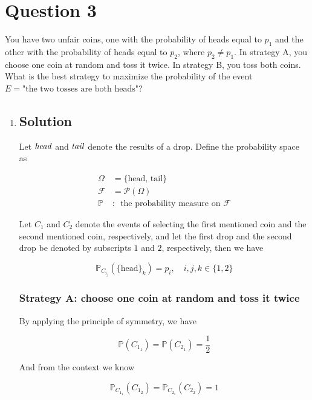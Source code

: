 \documentclass[12pt]{article}
\newcommand{\bP}{\mathbb{P}}
\begin{document}
	
	\section*{Question 3}
	
	\noindent You have two unfair coins, one with the probability of heads equal to $p_1$ and the other with the probability of heads equal to $p_2$, where $p_2 \neq p_1$. In strategy A, you choose one coin at random and toss it twice. In strategy B, you toss both coins. What is the best strategy to maximize the probability of the event $E = \text{"the two tosses are both heads"}$?
	
	\begin{enumerate}[label={},leftmargin=0in]\item
		
		\subsection*{Solution}
			
			Let $\it{head}$ and $\it{tail}$ denote the results of a drop. Define the probability space as
		
			\[
			\begin{aligned}
				\Omega &= \{\mathrm{head},\,\mathrm{tail}\}\\
				\mathcal{F} &= \mathcal{P}(\Omega)\\
				\bP &:\enspace \text{the probability measure on $\mathcal{F}$}
			\end{aligned}
			\]
			
			Let $C_1$ and $C_2$ denote the events of selecting the first mentioned coin and the second mentioned coin, respectively, and let the first drop and the second drop be denoted by subscripts $1$ and $2$, respectively, then we have
			
			\[\bP_{C_{i_j}}(\{\mathrm{head}\}_k) = p_i,\quad i,j,k\in\{1,2\}\]
			
			\subsubsection*{Strategy A: choose one coin at random and toss it twice}
			
			By applying the principle of symmetry, we have
			
			\[\bP(C_{1_1}) = \bP(C_{2_1}) = \frac{1}{2}\]
			
			And from the context we know
			
			\[\bP_{C_{1_1}}(C_{1_2}) = \bP_{C_{2_1}}(C_{2_2}) = 1\]
			

\end{enumerate}
\end{document}
